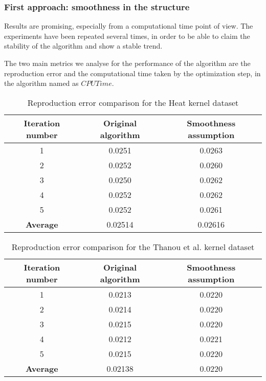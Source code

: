 \subsubsection{First approach: smoothness in the structure}
Results are promising, especially from a computational time point of view. The experiments have been repeated several times, in order to be able to claim the stability of the algorithm and show a stable trend.

The two main metrics we analyse for the performance of the algorithm are the reproduction error and the computational time taken by the optimization step, in the algorithm named as $CPUTime$.

\begin{table}[htbp]
  \centering
  \begin{tabular}{c|c|c}
    \multicolumn{1}{c|}{\textbf{Iteration number}} &
    \multicolumn{1}{c}{\textbf{Original algorithm}} &
    \multicolumn{1}{|c}{\textbf{Smoothness assumption}}\\
    \hline
    1 & 0.0251 & 0.0263\\
    2 & 0.0252 & 0.0260\\
    3 & 0.0250 & 0.0262\\
    4 & 0.0252 & 0.0262\\
    5 & 0.0252 & 0.0261\\
    \textbf{Average} & 0.02514 & 0.02616\\
  \end{tabular}
  \caption{Reproduction error comparison for the Heat kernel dataset}
  \label{tab:errorHeat_struct}
\end{table}

\begin{table}[htbp]
  \centering
  \begin{tabular}{c|c|c}
    \multicolumn{1}{c|}{\textbf{Iteration number}} &
    \multicolumn{1}{c}{\textbf{Original algorithm}} &
    \multicolumn{1}{|c}{\textbf{Smoothness assumption}}\\
    \hline
    1 & 0.0213 & 0.0220\\
    2 & 0.0214 & 0.0220\\
    3 & 0.0215 & 0.0220\\
    4 & 0.0212 & 0.0221\\
    5 & 0.0215 & 0.0220\\
    \textbf{Average} & 0.02138 & 0.0220\\
  \end{tabular}
  \caption{Reproduction error comparison for the Thanou et al. kernel dataset}
  \label{tab:errorDorina_struct}
\end{table}

